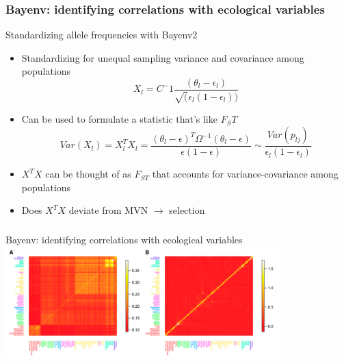 \begin{frame}
\frametitle{Bayenv: identifying correlations with ecological
variables}
\begin{block}{Standardizing allele frequencies with Bayenv2}
\begin{itemize}
\item{Standardizing for unequal sampling variance and covariance 
among populations}
\begin{equation}
X_l = C^-1 \frac{(\theta_l-\epsilon_l)}{\sqrt(\epsilon_l(1-\epsilon_l))}	
\end{equation}
\item{Can be used to formulate a statistic that's like $F_ST$}
\begin{equation}
Var(X_l) = X_l^T X_l =
\frac{(\theta_l-\epsilon)^T\Omega^{-1}(\theta_l-\epsilon)}
{\epsilon(1-\epsilon)} \sim 
\frac{Var(p_{lj})}{\epsilon_l(1-\epsilon_l)}
\end{equation}
\item{$X^TX$ can be thought of as $F_{ST}$ that accounts for
variance-covariance among populations}
\item{Does $X^TX$ deviate from MVN $\longrightarrow$ selection}
\end{itemize}
\end{block}
\end{frame}

\begin{frame}
\frametitle{}
\begin{block}{Bayenv: identifying correlations with ecological
variables}
\centering
\includegraphics[width=0.8\textwidth]{xtx.png}\\
\tiny
\citet[Figure 2]{Gunther:2013ik}
\end{block}
\end{frame}

